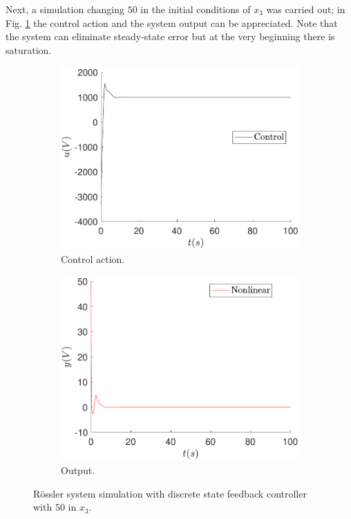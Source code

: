 	Next, a simulation changing $50$ in the initial conditions of $x_3$ was carried out; in Fig. \ref{fig:feedback_ref0_x30_5} the control action and the system output can be appreciated. Note that the system can eliminate steady-state error but at the very beginning there is saturation.
	\begin{figure}
        \centering
        \begin{subfigure}[b]{0.475\textwidth}
            \centering
            \includegraphics[scale=0.425]{files/feedback/Ref0/control_sfc_x30_50_ref_0.pdf}
            \caption{Control action.}
        \end{subfigure}
        \vskip0.1cm
        \begin{subfigure}[b]{0.475\textwidth}   
            \centering 
            \includegraphics[scale=0.425]{files/feedback/Ref0/sfc_x30_50_ref_0.pdf}
            \caption{Output.}
        \end{subfigure}
        \caption{Rössler system simulation with discrete state feedback controller with $50$ in $x_3$.}
        \label{fig:feedback_ref0_x30_5}
	\end{figure}
	
